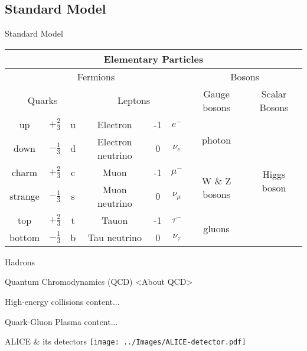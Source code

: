 \documentclass{beamer}
\begin{document}
\subsection{Standard Model}
\begin{frame}{Standard Model}
	\renewcommand{\arraystretch}{1.5}
	\begin{table}\tiny
	\begin{tabular}{|c|c|c|c|c|c|c|c|}
		\hline
		\multicolumn{8}{|c|}{Elementary Particles}\\
		\hline
		\multicolumn{6}{|c|}{Fermions} & \multicolumn{2}{|c|}{Bosons}\\
		\hline
		\multicolumn{3}{|c|}{Quarks} & \multicolumn{3}{|c|}{Leptons} & Gauge bosons & Scalar Bosons\\
		\hline
		up & $+\frac{2}{3}$ & u & Electron & -1 & $e^-$ & \multirow{2}{*}{photon} & \multirow{6}{*}{Higgs boson} \\
		down & $-\frac{1}{3}$ & d & Electron neutrino & 0 & $\nu_e$ & &\\
		charm & $+\frac{2}{3}$ & c & Muon & -1 & $\mu^-$ & \multirow{2}{*}{W \& Z bosons} &\\
		strange & $-\frac{1}{3}$ & s & Muon neutrino & 0 & $\nu_\mu$ & &\\
		top & $+\frac{2}{3}$ & t & Tauon & -1 & $\tau^-$ & \multirow{2}{*}{gluons} &\\
		bottom & $-\frac{1}{3}$ & b & Tau neutrino & 0 & $\nu_\tau$ & &\\
		\hline
	\end{tabular}
	\end{table}
\end{frame}
\begin{frame}{Hadrons}
	
\end{frame}
\begin{frame}{Quantum Chromodynamics (QCD)}
	<About QCD>
\end{frame}
\begin{frame}{High-energy collisions}
	content...
\end{frame}
\begin{frame}{Quark-Gluon Plasma}
	content...
\end{frame}
\begin{frame}{ALICE \& its detectors}
	\texttt{[image: ../Images/ALICE-detector.pdf]}
\end{frame}
\end{document}
